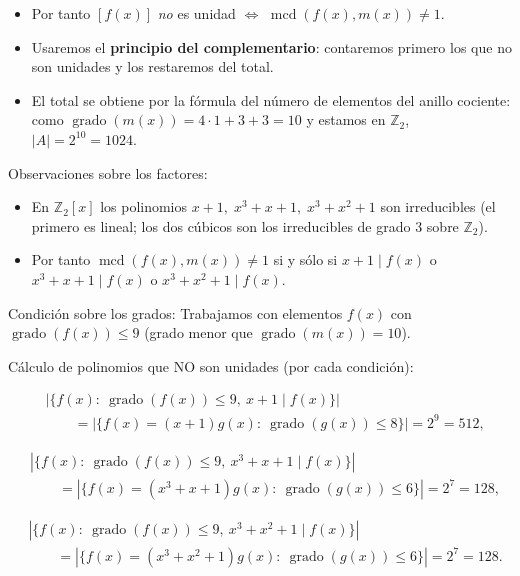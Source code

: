 \documentclass[a4paper,12pt]{article}
\begin{document}
\begin{ejercicio}[title=Ejercicio 10]
\begin{itemize}
\item Por tanto \([f(x)]\) \emph{no} es unidad \(\Longleftrightarrow\) \(\operatorname{mcd}(f(x),m(x))\neq 1\).
\item Usaremos el \textbf{principio del complementario}: contaremos primero los que no son unidades y los restaremos del total.
\item El total se obtiene por la fórmula del número de elementos del anillo cociente: como \(\operatorname{grado}(m(x))=4\cdot1+3+3=10\) y estamos en \(\mathbb{Z}_2\), \(|A|=2^{10}=1024\).
\end{itemize}

Observaciones sobre los factores:
\begin{itemize}
\item En \(\mathbb{Z}_2[x]\) los polinomios \(x+1,\; x^3+x+1,\; x^3+x^2+1\) son irreducibles (el primero es lineal; los dos cúbicos son los irreducibles de grado \(3\) sobre \(\mathbb{Z}_2\)).  
\item Por tanto \(\operatorname{mcd}(f(x),m(x))\neq 1\) si y sólo si \(x+1\mid f(x)\) o \(x^3+x+1\mid f(x)\) o \(x^3+x^2+1\mid f(x)\).
\end{itemize}

Condición sobre los grados:
Trabajamos con elementos \(f(x)\) con \(\operatorname{grado}(f(x))\le 9\) (grado menor que \(\operatorname{grado}(m(x))=10\)).

\vspace{0.5em}

Cálculo de polinomios que NO son unidades (por cada condición):

\[
\begin{aligned}
&\left|\{f(x):\ \operatorname{grado}(f(x))\le 9,\ x+1\mid f(x)\}\right|
\\[4pt]
&\qquad=\left|\{f(x)=(x+1)g(x):\ \operatorname{grado}(g(x))\le 8\}\right|
= 2^{9}=512,
\end{aligned}
\]

\[
\begin{aligned}
&\left|\{f(x):\ \operatorname{grado}(f(x))\le 9,\ x^3+x+1\mid f(x)\}\right|
\\[4pt]
&\qquad=\left|\{f(x)=(x^3+x+1)g(x):\ \operatorname{grado}(g(x))\le 6\}\right|
= 2^{7}=128,
\end{aligned}
\]

\[
\begin{aligned}
&\left|\{f(x):\ \operatorname{grado}(f(x))\le 9,\ x^3+x^2+1\mid f(x)\}\right|
\\[4pt]
&\qquad=\left|\{f(x)=(x^3+x^2+1)g(x):\ \operatorname{grado}(g(x))\le 6\}\right|
= 2^{7}=128.
\end{aligned}
\]


\end{ejercicio}
\end{document}
